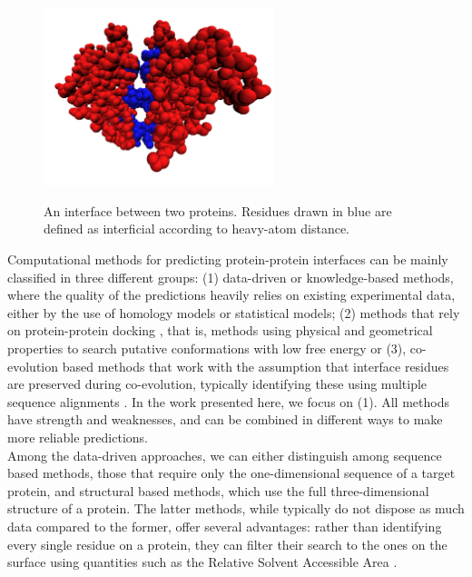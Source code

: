 \documentclass[10pt,a4paper,twoside]{book}
\begin{document}
\begin{figure}
\centering
\caption{An interface between two proteins. Residues drawn in blue are defined as interficial according to heavy-atom distance.}
\includegraphics[width=0.6\textwidth]{figures/chapter4/interface}
\label{fig:interface}
\end{figure}

Computational methods for predicting protein-protein interfaces can be mainly classified in three different groups: (1) data-driven or knowledge-based methods, where the quality of the predictions heavily relies on existing experimental data, either by the use of homology models \cite{Jordan2012, Xue2011} or statistical models; (2) methods that rely on protein-protein docking \cite{Vakser2014}, that is, methods using physical and geometrical properties to search putative conformations with low free energy or (3), co-evolution based methods that work with the assumption that interface residues are preserved during co-evolution, typically identifying these using multiple sequence alignments \cite{Hopf2014}. In the work presented here, we focus on (1). All methods have strength and weaknesses, and can be combined in different ways to make more reliable predictions.\\

Among the data-driven approaches, we can either distinguish among sequence based methods, those that require only the one-dimensional sequence of a target protein, and structural based methods, which use the full three-dimensional structure of a protein. The latter methods, while typically do not dispose as much data compared to the former, offer several advantages: rather than identifying every single residue on a protein, they can filter their search to the ones on the surface using quantities such as the Relative Solvent Accessible Area \cite{Tien2013}.\\
\end{document}
